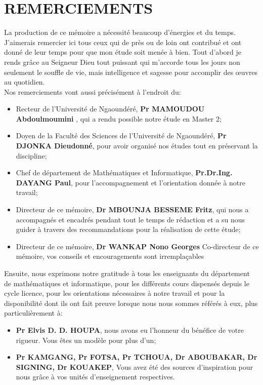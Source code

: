 \chapter*{REMERCIEMENTS}
La production de ce mémoire a nécessité beaucoup d’énergies et du temps. J’aimerais remercier ici tous ceux qui de près ou de loin ont contribué et ont donné de leur temps pour que mon étude soit menée à bien. Tout d'abord je rends gr\^ace au Seigneur Dieu tout puissant qui m'accorde tous les jours non seulement le souffle de vie, mais intelligence et sagesse pour accomplir des \oe uvres au quotidien. \\
Nos remerciements  vont aussi précisément à l'endroit du:
\begin{itemize}
	\item  Recteur de l'Université de Ngaoundéré,  {\footnotesize\bfseries Pr MAMOUDOU Abdoulmoumini} , qui a rendu possible notre étude en Master 2;
	\item  Doyen de la Faculté des Sciences de l'Université de Ngaoundéré, {\footnotesize\bfseries Pr DJONKA Dieudonné}, pour avoir organisé nos études tout en préservant la discipline;
	\item Chef de département de Mathématiques et Informatique,  { \footnotesize\bfseries Pr.Dr.Ing. DAYANG Paul}, pour l'accompagnement et l'orientation donnée à notre travail;
	\item Directeur de ce mémoire,  {\footnotesize\bfseries Dr  MBOUNJA BESSEME  Fritz}, qui nous a accompagnés et encadrés pendant tout le temps de rédaction et a su nous guider à travers des recommandations pour la réalisation de cette étude;
	\item Directeur de ce mémoire,  {\footnotesize\bfseries Dr  WANKAP Nono Georges} Co-directeur de ce mémoire, vos conseils et encouragements sont irremplaçables 
\end{itemize}
\par Ensuite, nous exprimons notre gratitude à tous les enseignants du département de mathématiques et informatique, pour
les différents cours dispensés depuis le cycle licence, pour les orientations nécessaires à
notre travail et pour la disponibilité dont ils ont fait preuve lorsque nous nous sommes référés à eux, plus particulièrement à:
\begin{itemize}
	\item { \footnotesize\bfseries Pr Elvis D. D.    HOUPA}, nous  avons eu  l’honneur du bénéfice de votre rigueur. Vous êtes un modèle pour plus d’un;
	\item  {\footnotesize \bfseries Pr KAMGANG, Pr FOTSA, Pr TCHOUA, Dr ABOUBAKAR, Dr SIGNING, Dr KOUAKEP}, Vous avez été des sources d'inspiration pour nous gr\^ace à vos unités d'enseignement respectives.
\end{itemize}
